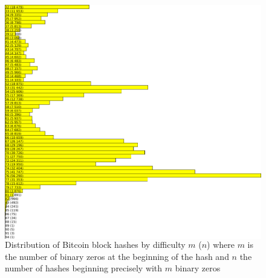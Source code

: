 \documentclass{beamer}
\begin{document}
\begin{frame}
\begin{figure}
      \begin{columns}
        \includegraphics[width=\textwidth]{illustrations/binHashesStats.png}
        \caption{Distribution of Bitcoin block hashes by difficulty $m$ ($n$) where $m$ is the number of binary zeros at the beginning of the hash and $n$ the number of hashes beginning precisely with $m$ binary zeros}
        \label{fig:example right}
      \end{columns}
    \end{figure}


\end{frame}
\end{document}

